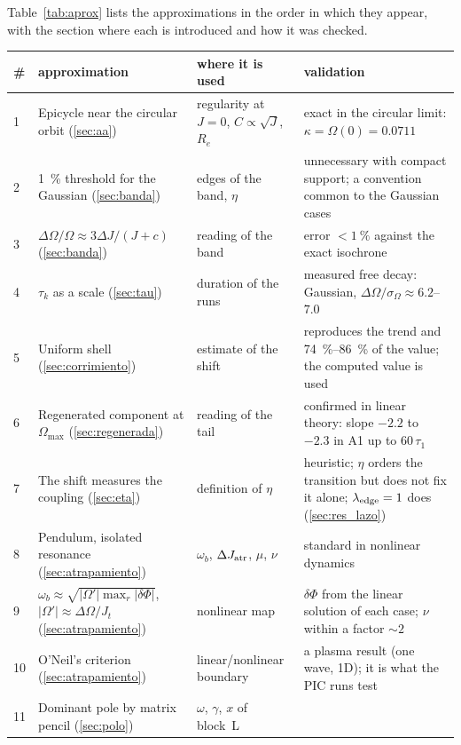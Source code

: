 \documentclass[11pt,a4paper]{article}
\begin{document}
Table~\ref{tab:aprox} lists the approximations in the order in which they appear, with
the section where each is introduced and how it was checked.

\begin{table}[!htbp]
\centering
\small
\begin{tabular}{p{0.6cm}p{4.3cm}p{3.1cm}p{5.6cm}}
\toprule
\# & approximation & where it is used & validation\\
\midrule
1 & Epicycle near the circular orbit (\ref{sec:aa}) & regularity at $J=0$, $C\propto\sqrt J$, $R_e$ &
  exact in the circular limit: $\kappa=\Omega(0)=0.0711$\\
2 & \SI{1}{\%} threshold for the Gaussian (\ref{sec:banda}) & edges of the band, $\eta$ &
  unnecessary with compact support; a convention common to the Gaussian cases\\
3 & $\Delta\Omega/\Omega\approx3\Delta J/(J+c)$ (\ref{sec:banda}) & reading of the band &
  error $<\SI{1}{\%}$ against the exact isochrone\\
4 & $\tau_k$ as a scale (\ref{sec:tau}) & duration of the runs &
  measured free decay: Gaussian, $\Delta\Omega/\sigma_\Omega\approx6.2$--$7.0$\\
5 & Uniform shell (\ref{sec:corrimiento}) & estimate of the shift &
  reproduces the trend and \SI{74}{\%}--\SI{86}{\%} of the value; the computed value is used\\
6 & Regenerated component at $\Omega_{\max}$ (\ref{sec:regenerada}) & reading of the tail &
  confirmed in linear theory: slope $-2.2$ to $-2.3$ in A1 up to $60\,\tau_1$\\
7 & The shift measures the coupling (\ref{sec:eta}) & definition of $\eta$ &
  heuristic; $\eta$ orders the transition but does not fix it alone; $\lambda_{\rm edge}=1$ does (\ref{sec:res_lazo})\\
8 & Pendulum, isolated resonance (\ref{sec:atrapamiento}) & $\omega_b$, $\Delta J_{\rm atr}$, $\mu$, $\nu$ &
  standard in nonlinear dynamics\\
9 & $\omega_b\approx\sqrt{|\Omega'|\max_r|\delta\Phi|}$, $|\Omega'|\approx\Delta\Omega/J_t$ (\ref{sec:atrapamiento}) & nonlinear map &
  $\delta\Phi$ from the linear solution of each case; $\nu$ within a factor $\sim2$\\
10 & O'Neil's criterion (\ref{sec:atrapamiento}) & linear/nonlinear boundary &
  a plasma result (one wave, 1D); it is what the PIC runs test\\
11 & Dominant pole by matrix pencil (\ref{sec:polo}) & $\omega$, $\gamma$, $x$ of block~L &

\end{tabular}
\end{table}
\end{document}
